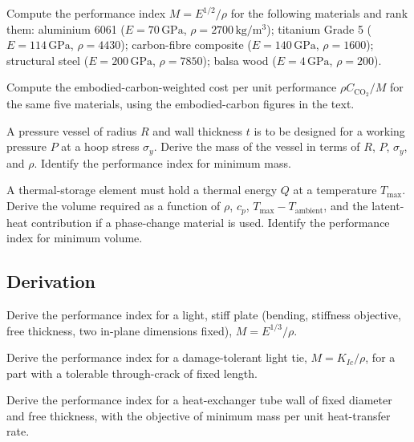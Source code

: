 \begin{exercise}
Compute the performance index $M = E^{1/2} / \rho$ for the
following materials and rank them: aluminium 6061 ($E = 70\,\text{GPa}$,
$\rho = 2700\,\text{kg}/\text{m}^3$); titanium Grade 5 ($E = 114\,
\text{GPa}$, $\rho = 4430$); carbon-fibre composite ($E = 140\,\text{GPa}$,
$\rho = 1600$); structural steel ($E = 200\,\text{GPa}$, $\rho = 7850$);
balsa wood ($E = 4\,\text{GPa}$, $\rho = 200$).
\end{exercise}

\begin{exercise}
Compute the embodied-carbon-weighted cost per unit performance
$\rho C_{\text{CO}_2} / M$ for the same five materials, using the
embodied-carbon figures in the text.
\end{exercise}

\begin{exercise}
A pressure vessel of radius $R$ and wall thickness $t$ is to be
designed for a working pressure $P$ at a hoop stress $\sigma_y$. Derive
the mass of the vessel in terms of $R$, $P$, $\sigma_y$, and $\rho$.
Identify the performance index for minimum mass.
\end{exercise}

\begin{exercise}
A thermal-storage element must hold a thermal energy $Q$ at a
temperature $T_{\max}$. Derive the volume required as a function of
$\rho$, $c_p$, $T_{\max} - T_{\text{ambient}}$, and the latent-heat
contribution if a phase-change material is used. Identify the performance
index for minimum volume.
\end{exercise}

\subsection*{Derivation}

\begin{exercise}
Derive the performance index for a light, stiff plate (bending,
stiffness objective, free thickness, two in-plane dimensions fixed),
$M = E^{1/3} / \rho$.
\end{exercise}

\begin{exercise}
Derive the performance index for a damage-tolerant light tie,
$M = K_{Ic} / \rho$, for a part with a tolerable through-crack of fixed
length.
\end{exercise}

\begin{exercise}
Derive the performance index for a heat-exchanger tube wall of fixed
diameter and free thickness, with the objective of minimum mass per
unit heat-transfer rate.
\end{exercise}

